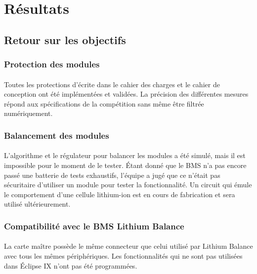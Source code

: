 \section{Résultats}

	\subsection{Retour sur les objectifs}
	
		\subsubsection{Protection des modules}
	
			\paragraph{}
			Toutes les protections d'écrite dans le cahier des charges et le cahier de conception ont été implémentées et validées. La précision des différentes mesures répond aux spécifications de la compétition sans même être filtrée numériquement.

		\subsubsection{Balancement des modules}

			\paragraph{}
			L'algorithme et le régulateur pour balancer les modules a été simulé, mais il est impossible pour le moment de le tester. Étant donné que le BMS n'a pas encore passé une batterie de tests exhaustifs, l'équipe a jugé que ce n'était pas sécuritaire d'utiliser un module pour tester la fonctionnalité. Un circuit qui émule le comportement d'une cellule lithium-ion est en cours de fabrication et sera utilisé ultérieurement.
	
		\subsubsection{Compatibilité avec le BMS Lithium Balance}
	
			\paragraph{}
			La carte maître possède le même connecteur que celui utilisé par Lithium Balance avec tous les mêmes périphériques. Les fonctionnalités qui ne sont pas utilisées dans Éclipse IX n'ont pas été programmées.
		
